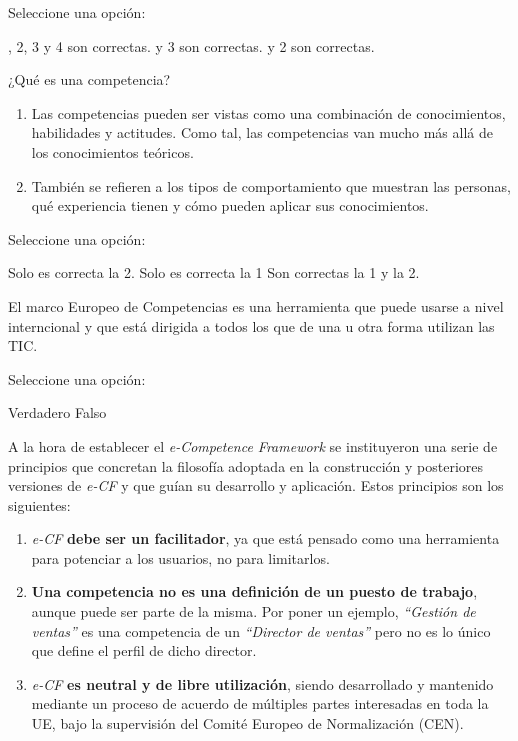 \documentclass[a4paper,answers]{exam}
\begin{document}
\begin{questions}
  Seleccione una opción:
  
  \begin{choices}
    , 2, 3 y 4 son correctas.
     y 3 son correctas.
     y 2 son correctas.
  \end{choices}
  
  \question ¿Qué es una competencia?

  \begin{enumerate}
  \item Las competencias pueden ser vistas como una combinación de
    conocimientos, habilidades y actitudes. Como tal, las competencias
    van mucho más allá de los conocimientos teóricos.
  \item También se refieren a los tipos de comportamiento que muestran
    las personas, qué experiencia tienen y cómo pueden aplicar sus
    conocimientos.
  \end{enumerate}

  Seleccione una opción:

  \begin{choices}
    \choice Solo es correcta la 2.
    \choice Solo es correcta la 1
    \CorrectChoice Son correctas la 1 y la 2.
  \end{choices}

  \question El marco Europeo de Competencias es una herramienta que
  puede usarse a nivel interncional y que está dirigida a todos los
  que de una u otra forma utilizan las TIC.

  Seleccione una opción:

  \begin{choices}
    \CorrectChoice Verdadero
    \choice Falso
  \end{choices}

  \question A la hora de establecer el \emph{e-Competence Framework}
  se instituyeron una serie de principios que concretan la filosofía
  adoptada en la construcción y posteriores versiones de \emph{e-CF} y
  que guían su desarrollo y aplicación. Estos principios son los
  siguientes:

  \begin{enumerate}
  \item \emph{e-CF} \textbf{debe ser un facilitador}, ya que está
    pensado como una herramienta para potenciar a los usuarios, no
    para limitarlos.
  \item \textbf{Una competencia no es una definición de un puesto de
      trabajo}, aunque puede ser parte de la misma. Por poner un
    ejemplo, \emph{``Gestión de ventas''} es una competencia de un
    \emph{``Director de ventas''} pero no es lo único que define el
    perfil de dicho director.
  \item \emph{e-CF} \textbf{es neutral y de libre utilización}, siendo
    desarrollado y mantenido mediante un proceso de acuerdo de
    múltiples partes interesadas en toda la UE, bajo la supervisión
    del Comité Europeo de Normalización (CEN).
  \end{enumerate}


\end{questions}
\end{document}
